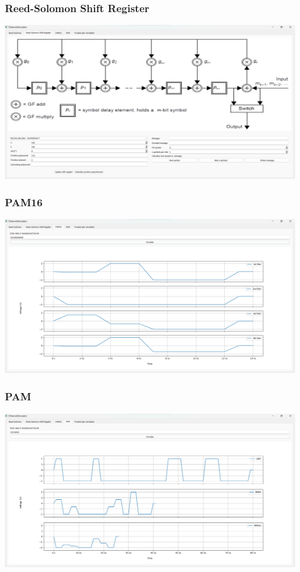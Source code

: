 \documentclass{beamer}
\begin{document}
\begin{frame}
    \frametitle{Reed-Solomon Shift Register}
    \begin{center}
        \includegraphics[width=0.95\textwidth, height=0.85\textheight,keepaspectratio]{prezentacja_rs_sr.png}
    \end{center}
\end{frame}

\begin{frame}
    \frametitle{PAM16}
    \begin{center}
        \includegraphics[width=0.95\textwidth, height=0.85\textheight,keepaspectratio]{prezentacja_pam16.png}
    \end{center}
\end{frame}

\begin{frame}
    \frametitle{PAM}
    \begin{center}
        \includegraphics[width=0.95\textwidth, height=0.85\textheight,keepaspectratio]{prezentacja_pam.png}
    \end{center}
\end{frame}
\end{document}

